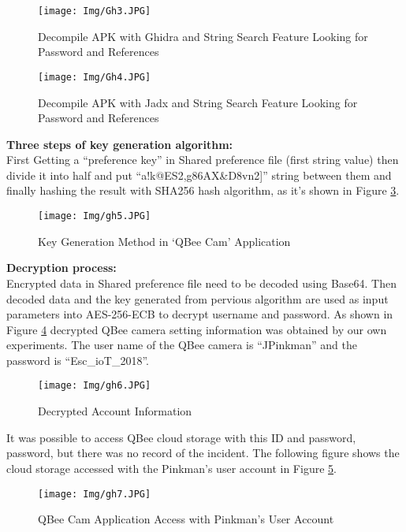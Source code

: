 \documentclass{easychair}
\begin{document}
\begin{figure}[H]
    \centering
    \texttt{[image: Img/Gh3.JPG]}
    \caption{Decompile APK with Ghidra and String Search Feature Looking for Password and References}
    \label{fig:Decompile APK with Ghidra and String Search Feature Looking for Password and References}
\end{figure}

\begin{figure}[H]
    \centering
    \texttt{[image: Img/Gh4.JPG]}
    \caption{Decompile APK with Jadx and String Search Feature Looking for Password and References}
    \label{fig:Decompile APK with Jadx and String Search Feature Looking for Password and References}
\end{figure}

\textbf{Three steps of key generation algorithm:}\\
First Getting a “preference key” in Shared preference file (first string value) then divide it into half and put “a!k@ES2,g86AX&D8vn2]” string between them and finally hashing the result with SHA256 hash algorithm, as it's shown in Figure \ref{fig:Key Generation Method in ‘QBee Cam’ Application}.
\begin{figure}[H]
    \centering
    \texttt{[image: Img/gh5.JPG]}
    \caption{Key Generation Method in ‘QBee Cam’ Application}
    \label{fig:Key Generation Method in ‘QBee Cam’ Application}
\end{figure}

\textbf{Decryption process:}\\
Encrypted data in Shared preference file need to be decoded using Base64. Then decoded data and the key generated from pervious algorithm are used as input parameters into AES-256-ECB to decrypt username and password. As shown in Figure \ref{fig:Decrypted account information} decrypted QBee camera setting information was obtained by our own experiments. The user name of the QBee camera is “JPinkman” and the password is “Esc\_ioT\_2018”.
\begin{figure}[H]
    \centering
    \texttt{[image: Img/gh6.JPG]}
    \caption{Decrypted Account Information}
    \label{fig:Decrypted account information}
\end{figure}

It was possible to access QBee cloud storage with this ID and password, password, but there was no record of the incident. The following figure shows the cloud storage accessed with the Pinkman’s user account in Figure \ref{fig: QBee Cam application access with the Pinkman’s user account}.
\begin{figure}[H]
    \centering
    \texttt{[image: Img/gh7.JPG]}
    \caption{QBee Cam Application Access with Pinkman’s User Account}
    \label{fig: QBee Cam application access with the Pinkman’s user account}
\end{figure}
\end{document}
